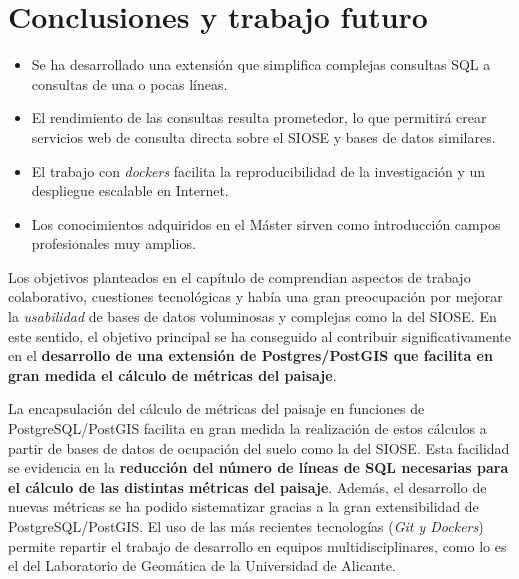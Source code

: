 \chapter{Conclusiones y trabajo futuro}\label{chap:concl}

\begin{graybox}
\begin{itemize}
\item Se ha desarrollado una extensión que simplifica complejas consultas SQL a consultas de una o pocas líneas.
\item El rendimiento de las consultas resulta prometedor, lo que permitirá crear servicios web de consulta directa sobre el SIOSE y bases de datos similares.   
\item El trabajo con \textit{dockers} facilita la reproducibilidad de la investigación y un despliegue escalable en Internet.
\item Los conocimientos adquiridos en el Máster sirven como introducción campos profesionales muy amplios.
\end{itemize}
\end{graybox}

Los objetivos planteados en el capítulo de  comprendian aspectos de trabajo colaborativo, cuestiones tecnológicas y había una gran preocupación por mejorar la \textit{usabilidad} de bases de datos voluminosas y complejas como la del SIOSE. En este sentido, el objetivo principal se ha conseguido al contribuir significativamente en el \textbf{desarrollo de una extensión de Postgres/PostGIS que facilita en gran medida el cálculo de métricas del paisaje}. 

La encapsulación del cálculo de métricas del paisaje en funciones de PostgreSQL/PostGIS facilita en gran medida la realización de estos cálculos a partir de bases de datos de ocupación del suelo como la del SIOSE. Esta facilidad se evidencia en la \textbf{reducción del número de líneas de SQL necesarias para el cálculo de las distintas métricas del paisaje}. Además, el desarrollo de nuevas métricas se ha podido sistematizar gracias a la gran extensibilidad de PostgreSQL/PostGIS. El uso de las más recientes tecnologías (\textit{Git y Dockers}) permite repartir el trabajo de desarrollo en equipos multidisciplinares, como lo es el del Laboratorio de Geomática de la Universidad de Alicante.


